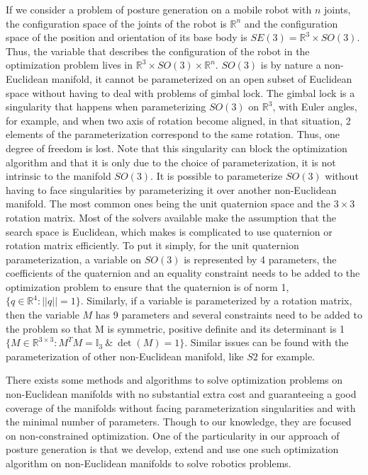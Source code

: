 If we consider a problem of posture generation on a mobile robot with $n$ joints, the configuration space of the joints of the robot is $\mathbb{R}^n$ and the configuration space of the position and orientation of its base body is $SE(3) = \mathbb{R}^3\times SO(3)$.
Thus, the variable that describes the configuration of the robot in the optimization problem lives in $\mathbb{R}^3\times SO(3) \times \mathbb{R}^n$.
$SO(3)$ is by nature a non-Euclidean manifold, it cannot be parameterized on an open subset of Euclidean space without having to deal with problems of gimbal lock.
The gimbal lock is a singularity that happens when parameterizing $SO(3)$ on $\mathbb{R}^3$, with Euler angles, for example, and when two axis of rotation become aligned, in that situation, 2 elements of the parameterization correspond to the same rotation.
Thus, one degree of freedom is lost.
Note that this singularity can block the optimization algorithm and that it is only due to the choice of parameterization, it is not intrinsic to the manifold $SO(3)$.
It is possible to parameterize $SO(3)$ without having to face singularities by parameterizing it over another non-Euclidean manifold.
The most common ones being the unit quaternion space and the $3\times 3$ rotation matrix.
Most of the solvers available make the assumption that the search space is Euclidean, which makes is complicated to use quaternion or rotation matrix efficiently.
To put it simply, for the unit quaternion parameterization, a variable on $SO(3)$ is represented by 4 parameters, the coefficients of the quaternion and an equality constraint needs to be added to the optimization problem to ensure that the quaternion is of norm 1, $\{q\in\mathbb{R}^4:||q||=1\}$.
Similarly, if a variable is parameterized by a rotation matrix, then the variable $M$ has 9 parameters and several constraints need to be added to the problem so that M is symmetric, positive definite and its determinant is 1 $\{M\in\mathbb{R}^{3\times 3}:M^T M = \mathbb{I}_3\  \&\ \det (M) = 1\}$.
Similar issues can be found with the parameterization of other non-Euclidean manifold, like $S2$ for example.

There exists some methods and algorithms to solve optimization problems on non-Euclidean manifolds with no substantial extra cost and guaranteeing a good coverage of the manifolds without facing parameterization singularities and with the minimal number of parameters.
Though to our knowledge, they are focused on non-constrained optimization.
One of the particularity in our approach of posture generation is that we develop, extend and use one such optimization algorithm on non-Euclidean manifolds to solve robotics problems.


